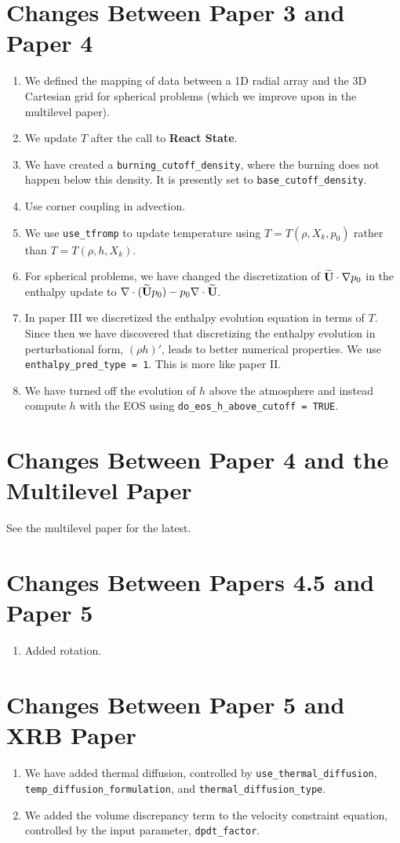 \section{Changes Between Paper 3 and Paper 4}
\begin{enumerate}
\item We defined the mapping of data between a 1D radial array and the 3D Cartesian
grid for spherical problems (which we improve upon in the multilevel paper).
\item We update $T$ after the call to {\bf React State}.
\item We have created a {\tt burning\_cutoff\_density}, where the burning does
not happen below this density.  It is presently set to {\tt base\_cutoff\_density}.
\item Use corner coupling in advection.
\item We use {\tt use\_tfromp} to update temperature using $T=T(\rho,X_k,p_0)$ rather 
than $T=T(\rho,h,X_k)$.
\item For spherical problems, we have changed the discretization of 
$\widetilde{{\bf U}}\cdot\nabla p_0$ in the enthalpy update to 
$\nabla\cdot(\widetilde{{\bf U}} p_0) - p_0\nabla\cdot\widetilde{{\bf U}}$.
\item In paper III we discretized the enthalpy evolution equation in
terms of $T$.  Since then we have discovered that 
discretizing the enthalpy evolution in perturbational form, $(\rho h)'$,
leads to better numerical properties.  We use {\tt enthalpy\_pred\_type = 1}.
This is more like paper II.
\item We have turned off the evolution of $h$ above the atmosphere and instead
compute $h$ with the EOS using {\tt do\_eos\_h\_above\_cutoff = TRUE}.
\end{enumerate}
\section{Changes Between Paper 4 and the Multilevel Paper}
See the multilevel paper for the latest.
\section{Changes Between Papers 4.5 and Paper 5}
\begin{enumerate}
\item Added rotation.
\end{enumerate}
\section{Changes Between Paper 5 and XRB Paper}
\begin{enumerate}
\item We have added thermal diffusion, controlled by {\tt use\_thermal\_diffusion},
{\tt temp\_diffusion\_formulation}, and {\tt thermal\_diffusion\_type}.
\item We added the volume discrepancy term to the velocity constraint equation,
controlled by the input parameter, {\tt dpdt\_factor}.
\end{enumerate}

